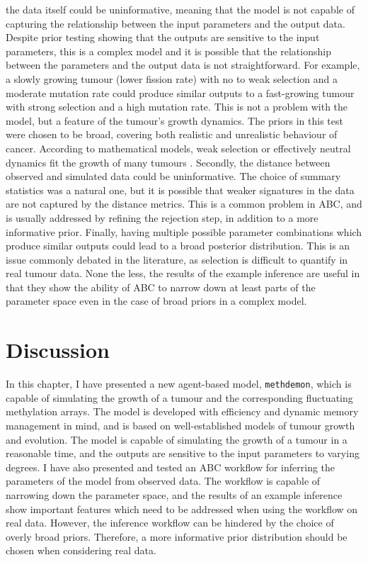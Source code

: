 the data itself could be uninformative, meaning that the model is not capable
of capturing the relationship between the input parameters and the output data.
Despite prior testing showing that the outputs are sensitive to the input
parameters, this is a complex model and it is possible that the relationship
between the parameters and the output data is not straightforward. For example,
a slowly growing tumour (lower fission rate) with no to weak selection and a
moderate mutation rate could produce similar outputs to a fast-growing tumour
with strong selection and a high mutation rate. This is not a problem with the
model, but a feature of the tumour's growth dynamics. The priors in this test
were chosen to be broad, covering both realistic and unrealistic behaviour of
cancer. According to mathematical models, weak selection or effectively neutral
dynamics fit the growth of many tumours \cite{williams_identification_2016}.
Secondly, the distance between observed and simulated data could be
uninformative. The choice of summary statistics was a natural one, but it is
possible that weaker signatures in the data are not captured by the distance
metrics. This is a common problem in ABC, and is usually addressed by refining
the rejection step, in addition to a more informative prior. Finally, having
multiple possible parameter combinations which produce similar outputs could
lead to a broad posterior distribution. This is an issue commonly debated in
the literature, as selection is difficult to quantify in real tumour data. None
the less, the results of the example inference are useful in that they show the
ability of ABC to narrow down at least parts of the parameter space even in the
case of broad priors in a complex model.

\section{Discussion}
In this chapter, I have presented a new agent-based model, \texttt{methdemon},
which is capable of simulating the growth of a tumour and the corresponding
fluctuating methylation arrays. The model is developed with efficiency and
dynamic memory management in mind, and is based on well-established models of
tumour growth and evolution. The model is capable of simulating the growth of a
tumour in a reasonable time, and the outputs are sensitive to the input
parameters to varying degrees. I have also presented and tested an ABC workflow
for inferring the parameters of the model from observed data. The workflow is
capable of narrowing down the parameter space, and the results of an example
inference show important features which need to be addressed when using the
workflow on real data. However, the inference workflow can be hindered by the
choice of overly broad priors. Therefore, a more informative prior distribution
should be chosen when considering real data.
